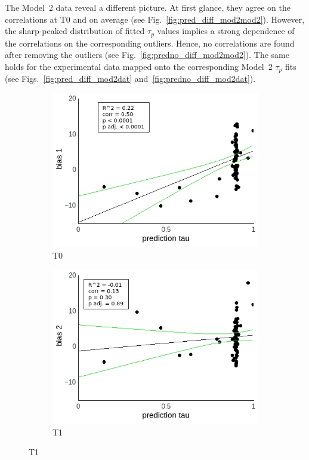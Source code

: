 \documentclass[a4paper]{scrreprt}
\begin{document}
The Model~2 data reveal a different picture. At first glance, they agree on the correlations at T0 and on average (see Fig.~\ref{fig:pred_diff_mod2mod2}). However, the sharp-peaked distribution of fitted $\tau_p$ values implies a strong dependence of the correlations on the corresponding outliers. Hence, no correlations are found after removing the outliers (see Fig.~\ref{fig:predno_diff_mod2mod2}). The same holds for the experimental data mapped onto the corresponding Model~2 $\tau_p$ fits (see Figs.~\ref{fig:pred_diff_mod2dat} and~\ref{fig:predno_diff_mod2dat}).


\begin{figure}
\centering
\begin{subfigure}[b]{0.49\textwidth}
        \includegraphics[width=\textwidth]{figs/sec3/pred/pred_diff_1_mod2mod2.jpeg}
        \caption{T0}
    \end{subfigure}
    \begin{subfigure}[b]{0.49\textwidth}
        \includegraphics[width=\textwidth]{figs/sec3/pred/pred_diff_2_mod2mod2.jpeg}
        \caption{T1}
    \end{subfigure}


\end{figure}
\end{document}
